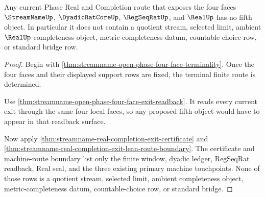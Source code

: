 \begin{theorem}
\label{thm:streamname-open-phase-four-face-scope-exactness}
Any current Phase Real and Completion route that exposes the four faces $\StreamNameUp$, $\DyadicRatCoreUp$, $\RegSeqRatUp$, and $\RealUp$ has no fifth object. In particular it does not contain a quotient stream, selected limit, ambient $\RealUp$ completeness object, metric-completeness datum, countable-choice row, or standard bridge row.
\end{theorem}
\begin{proof}
Begin with \autoref{thm:streamname-open-phase-four-face-terminality}. Once the four faces and their displayed support rows are fixed, the terminal finite route is determined.

Use \autoref{thm:streamname-open-phase-four-face-exit-readback}. It reads every current exit through the same four local faces, so any proposed fifth object would have to appear in that readback surface.

Now apply \autoref{thm:streamname-real-completion-exit-certificate} and \autoref{thm:streamname-real-completion-exit-lean-route-boundary}. The certificate and machine-route boundary list only the finite window, dyadic ledger, RegSeqRat readback, Real seal, and the three existing primary machine touchpoints. None of those rows is a quotient stream, selected limit, ambient completeness object, metric-completeness datum, countable-choice row, or standard bridge.
\end{proof}

